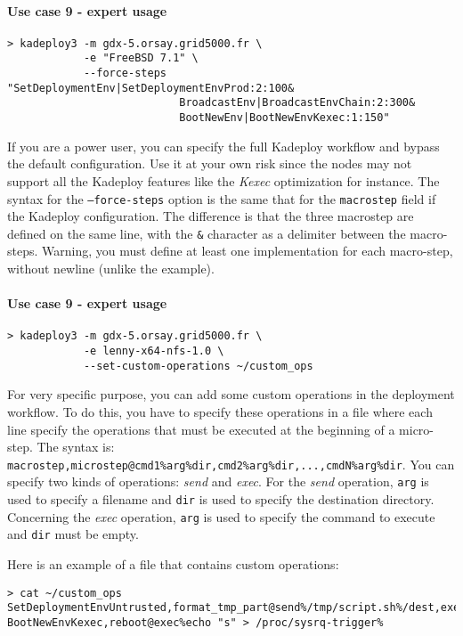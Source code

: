 \documentclass[a4wide,10pt,oneside]{book}
\begin{document}
\paragraph{Use case 9 - expert usage}
\begin{verbatim}
> kadeploy3 -m gdx-5.orsay.grid5000.fr \
            -e "FreeBSD 7.1" \
            --force-steps "SetDeploymentEnv|SetDeploymentEnvProd:2:100&
                           BroadcastEnv|BroadcastEnvChain:2:300&
                           BootNewEnv|BootNewEnvKexec:1:150"
\end{verbatim}
If you are a power user, you can specify the full Kadeploy workflow and bypass the default configuration. Use it at your own risk since the nodes may not support all the Kadeploy features like the \textit{Kexec} optimization for instance. The syntax for the \texttt{--force-steps} option is the same that for the \texttt{macrostep} field if the Kadeploy configuration. The difference is that the three macrostep are defined on the same line, with the \texttt{\&} character as a delimiter between the macro-steps. Warning, you must define at least one implementation for each macro-step, without newline (unlike the example).

\paragraph{Use case 9 - expert usage}
\begin{verbatim}
> kadeploy3 -m gdx-5.orsay.grid5000.fr \
            -e lenny-x64-nfs-1.0 \
            --set-custom-operations ~/custom_ops
\end{verbatim}
For very specific purpose, you can add some custom operations in the deployment workflow. To do this, you have to specify these operations in a file where each line specify the operations that must be executed at the beginning of a micro-step. The syntax is: \texttt{macrostep,microstep@cmd1\%arg\%dir,cmd2\%arg\%dir,...,cmdN\%arg\%dir}. You can specify two kinds of operations: \textit{send} and \textit{exec}. For the \textit{send} operation, \texttt{arg} is used to specify a filename and \texttt{dir} is used to specify the destination directory. Concerning the \textit{exec} operation, \texttt{arg} is used to specify the command to execute and \texttt{dir} must be empty.

Here is an example of a file that contains custom operations:
\begin{small}
\begin{verbatim}
> cat ~/custom_ops
SetDeploymentEnvUntrusted,format_tmp_part@send%/tmp/script.sh%/dest,exec%/dest/script.sh%
BootNewEnvKexec,reboot@exec%echo "s" > /proc/sysrq-trigger%
\end{verbatim}
\end{small}
\end{document}
